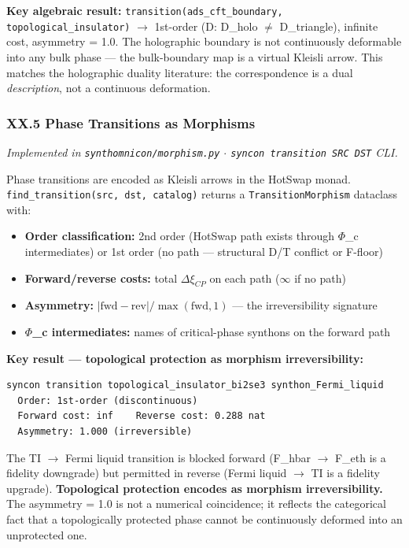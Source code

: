 \documentclass[12pt,a4paper]{article}
\begin{document}
\textbf{Key algebraic result:} \texttt{transition(ads\_cft\_boundary, topological\_insulator)} $\rightarrow$ 1st-order (D: D\_holo $\neq$ D\_triangle), infinite cost, asymmetry = 1.0. The holographic boundary is not continuously deformable into any bulk phase --- the bulk-boundary map is a virtual Kleisli arrow. This matches the holographic duality literature: the correspondence is a dual \emph{description}, not a continuous deformation.

\subsubsection{XX.5 Phase Transitions as Morphisms}

\emph{Implemented in \texttt{synthomnicon/morphism.py} $\cdot$ \texttt{syncon transition SRC DST} CLI.}

Phase transitions are encoded as Kleisli arrows in the HotSwap monad. \texttt{find\_transition(src, dst, catalog)} returns a \texttt{TransitionMorphism} dataclass with:

\begin{itemize}
    \item \textbf{Order classification:} 2nd order (HotSwap path exists through $\Phi$\_c intermediates) or 1st order (no path --- structural D/T conflict or F-floor)
    \item \textbf{Forward/reverse costs:} total $\Delta\xi_{CP}$ on each path ($\infty$ if no path)
    \item \textbf{Asymmetry:} $|\text{fwd} - \text{rev}| / \max(\text{fwd}, 1)$ --- the irreversibility signature
    \item \textbf{$\Phi$\_c intermediates:} names of critical-phase synthons on the forward path
\end{itemize}

\textbf{Key result --- topological protection as morphism irreversibility:}

\begin{lstlisting}
syncon transition topological_insulator_bi2se3 synthon_Fermi_liquid
  Order: 1st-order (discontinuous)
  Forward cost: inf    Reverse cost: 0.288 nat
  Asymmetry: 1.000 (irreversible)
\end{lstlisting}

The TI $\rightarrow$ Fermi liquid transition is blocked forward (F\_hbar $\rightarrow$ F\_eth is a fidelity downgrade) but permitted in reverse (Fermi liquid $\rightarrow$ TI is a fidelity upgrade). \textbf{Topological protection encodes as morphism irreversibility.} The asymmetry = 1.0 is not a numerical coincidence; it reflects the categorical fact that a topologically protected phase cannot be continuously deformed into an unprotected one.
\end{document}
